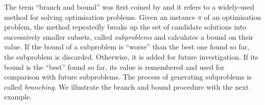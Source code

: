 \documentclass{mprop}
\theoremstyle{definition}
\begin{document}
The term ``branch and bound'' was first coined by \citet{Little63} and it refers to a widely-used method for solving optimisation problems. Given an instance $\pi$ of an optimisation problem, the method repeatedly breaks up the set of candidate solutions into successively smaller subsets, called \textit{subproblems} and calculates a bound on their value. If the bound of a subproblem  is ``worse'' than the best one found so far, the subproblem is discarded. Otherwise, it is added for future investigation. If its bound is the ``best'' found so far, its value is remembered and used for comparison with future subproblems. The process of generating subproblems is called \textit{branching}. We illustrate the branch and bound procedure with the next example.

\end{document}
